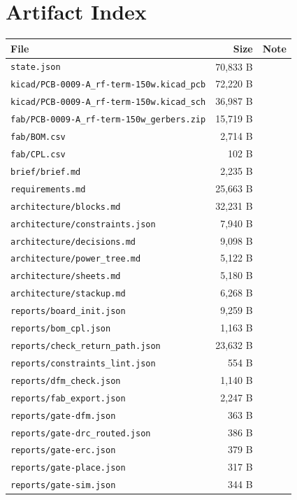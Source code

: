 \documentclass[11pt,a4paper]{article}
\begin{document}
\section{Artifact Index}
{\small
\begin{longtable}{p{9cm}rp{4cm}}
\toprule
\textbf{File} & \textbf{Size} & \textbf{Note} \\
\midrule
\endhead
\texttt{state.json} & 70,833 B &  \\
\texttt{kicad/PCB-0009-A\_rf-term-150w.kicad\_pcb} & 72,220 B &  \\
\texttt{kicad/PCB-0009-A\_rf-term-150w.kicad\_sch} & 36,987 B &  \\
\texttt{fab/PCB-0009-A\_rf-term-150w\_gerbers.zip} & 15,719 B &  \\
\texttt{fab/BOM.csv} & 2,714 B &  \\
\texttt{fab/CPL.csv} & 102 B &  \\
\texttt{brief/brief.md} & 2,235 B &  \\
\texttt{requirements.md} & 25,663 B &  \\
\texttt{architecture/blocks.md} & 32,231 B &  \\
\texttt{architecture/constraints.json} & 7,940 B &  \\
\texttt{architecture/decisions.md} & 9,098 B &  \\
\texttt{architecture/power\_tree.md} & 5,122 B &  \\
\texttt{architecture/sheets.md} & 5,180 B &  \\
\texttt{architecture/stackup.md} & 6,268 B &  \\
\texttt{reports/board\_init.json} & 9,259 B &  \\
\texttt{reports/bom\_cpl.json} & 1,163 B &  \\
\texttt{reports/check\_return\_path.json} & 23,632 B &  \\
\texttt{reports/constraints\_lint.json} & 554 B &  \\
\texttt{reports/dfm\_check.json} & 1,140 B &  \\
\texttt{reports/fab\_export.json} & 2,247 B &  \\
\texttt{reports/gate-dfm.json} & 363 B &  \\
\texttt{reports/gate-drc\_routed.json} & 386 B &  \\
\texttt{reports/gate-erc.json} & 379 B &  \\
\texttt{reports/gate-place.json} & 317 B &  \\
\texttt{reports/gate-sim.json} & 344 B &  \\

\end{longtable}}
\end{document}
